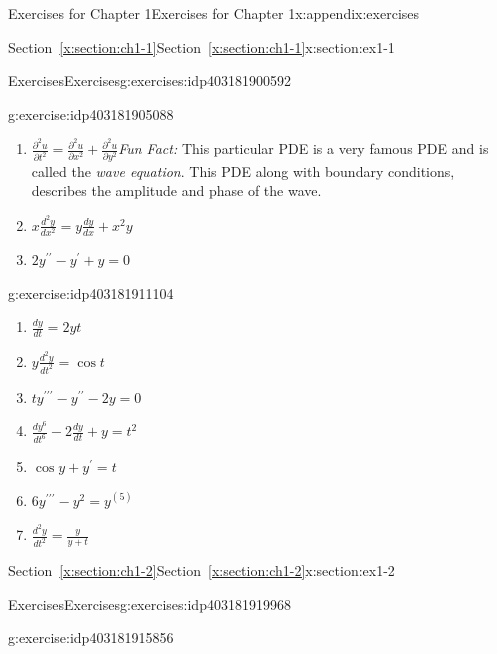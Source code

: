 \documentclass[oneside,10pt,]{book}
\newcommand{\xreffont}{\relax}
\numberwithin{equation}{section}
\numberwithin{equation}{section}
\begin{document}
\begin{appendixptx}{Exercises for Chapter 1}{}{Exercises for Chapter 1}{}{}{x:appendix:exercises}
\begin{sectionptx}{Section~{\xreffont\ref*{x:section:ch1-1}}}{}{Section~{\xreffont\ref*{x:section:ch1-1}}}{}{}{x:section:ex1-1}
\begin{exercises-subsection-numberless}{Exercises}{}{Exercises}{}{}{g:exercises:idp403181900592}
\begin{divisionexercise}{6}{}{}{g:exercise:idp403181905088}
\begin{enumerate}[label=(\alph*)]
\item{}\(\frac{\partial^{2}u}{\partial t^{2}}=\frac{\partial^{2}u}{\partial x^{2}}+\frac{\partial^{2}u}{\partial y^{2}}\)\emph{Fun Fact:} This particular PDE is a very famous PDE and is called the \emph{wave equation}. This PDE along with boundary conditions, describes the amplitude and phase of the wave.%
\item{}\(\displaystyle x\frac{d^{2}y}{dx^{2}}=y\frac{dy}{dx}+x^{2}y\)%
\item{}\(\displaystyle 2y^{\prime\prime}-y^{\prime}+y=0\)%
\end{enumerate}
\end{divisionexercise}%
\begin{divisionexercise}{7}{}{}{g:exercise:idp403181911104}%
%
\begin{enumerate}[label=(\alph*)]
\item{}\(\displaystyle \frac{dy}{dt}=2yt\)%
\item{}\(\displaystyle y\frac{d^{2}y}{dt^{2}}=\cos t\)%
\item{}\(\displaystyle ty^{\prime\prime\prime}-y^{\prime\prime}-2y=0\)%
\item{}\(\displaystyle \frac{dy^{6}}{dt^{6}}-2\frac{dy}{dt}+y=t^{2}\)%
\item{}\(\displaystyle \cos y+y^{\prime}=t\)%
\item{}\(\displaystyle 6y^{\prime\prime\prime}-y^{2}=y^{(5)}\)%
\item{}\(\displaystyle \frac{d^{2}y}{dt^{2}}=\frac{y}{y+t}\)%
\end{enumerate}
\end{divisionexercise}%
\end{exercises-subsection-numberless}
\end{sectionptx}
%
%
\typeout{************************************************}
\typeout{Section B.2 Section~{\xreffont\ref*{x:section:ch1-2}}}
\typeout{************************************************}
%
\begin{sectionptx}{Section~{\xreffont\ref*{x:section:ch1-2}}}{}{Section~{\xreffont\ref*{x:section:ch1-2}}}{}{}{x:section:ex1-2}
%
%
\typeout{************************************************}
\typeout{************************************************}
%
\begin{exercises-subsection-numberless}{Exercises}{}{Exercises}{}{}{g:exercises:idp403181919968}
\begin{divisionexercise}{1}{}{}{g:exercise:idp403181915856}%
\begin{image}{0}{1}{0}%

\end{image}
\end{divisionexercise}
\end{exercises-subsection-numberless}
\end{sectionptx}
\end{appendixptx}
\end{document}
